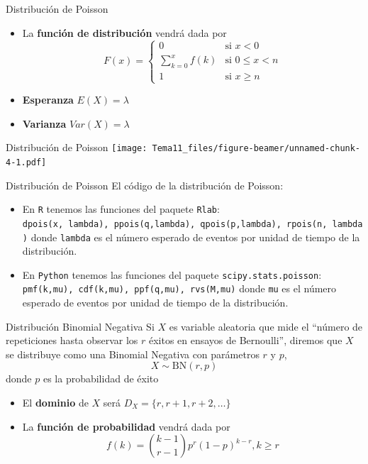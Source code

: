 \documentclass[
  ignorenonframetext,
]{beamer}
\providecommand{\tightlist}{%
  \setlength{\itemsep}{0pt}\setlength{\parskip}{0pt}}
\begin{document}
\begin{frame}{Distribución de Poisson}
\protect\hypertarget{distribuciuxf3n-de-poisson-1}{}
\begin{itemize}
\tightlist
\item
  La \textbf{función de distribución} vendrá dada por \[F(x) = \left\{
  \begin{array}{cl}
     0 & \text{si } x<0 
  \\ \sum_{k=0}^xf(k) & \text{si } 0\le x<n
  \\ 1 & \text{si } x\ge n
  \end{array}
  \right.\]
\item
  \textbf{Esperanza} \(E(X) = \lambda\)
\item
  \textbf{Varianza} \(Var(X) = \lambda\)
\end{itemize}
\end{frame}

\begin{frame}{Distribución de Poisson}
\protect\hypertarget{distribuciuxf3n-de-poisson-2}{}
\texttt{[image: Tema11\_files/figure-beamer/unnamed-chunk-4-1.pdf]}
\end{frame}

\begin{frame}[fragile]{Distribución de Poisson}
\protect\hypertarget{distribuciuxf3n-de-poisson-3}{}
El código de la distribución de Poisson:

\begin{itemize}
\tightlist
\item
  En \texttt{R} tenemos las funciones del paquete \texttt{Rlab}:
  \texttt{dpois(x,\ lambda),\ ppois(q,lambda),\ qpois(p,lambda),\ rpois(n,\ lambda)}
  donde \texttt{lambda} es el número esperado de eventos por unidad de
  tiempo de la distribución.
\item
  En \texttt{Python} tenemos las funciones del paquete
  \texttt{scipy.stats.poisson}:
  \texttt{pmf(k,mu),\ cdf(k,mu),\ ppf(q,mu),\ rvs(M,mu)} donde
  \texttt{mu} es el número esperado de eventos por unidad de tiempo de
  la distribución.
\end{itemize}
\end{frame}

\begin{frame}{Distribución Binomial Negativa}
\protect\hypertarget{distribuciuxf3n-binomial-negativa}{}
Si \(X\) es variable aleatoria que mide el ``número de repeticiones
hasta observar los \(r\) éxitos en ensayos de Bernoulli'', diremos que
\(X\) se distribuye como una Binomial Negativa con parámetros \(r\) y
\(p\), \[X\sim\text{BN}(r,p)\] donde \(p\) es la probabilidad de éxito

\begin{itemize}
\tightlist
\item
  El \textbf{dominio} de \(X\) será \(D_X = \{r, r+1, r+2,\dots\}\)
\item
  La \textbf{función de probabilidad} vendrá dada por
  \[f(k) = {k-1\choose r-1}p^r(1-p)^{k-r}, k\geq r\]
\end{itemize}
\end{frame}
\end{document}
